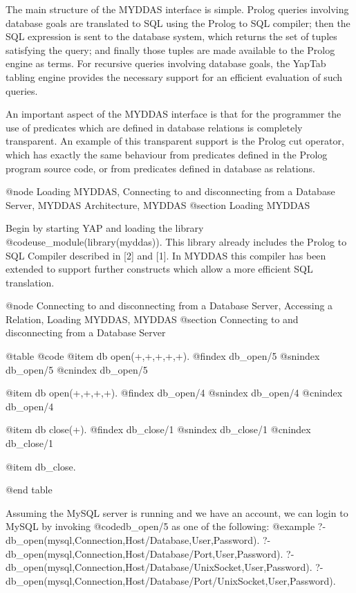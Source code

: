 {{{{{{{{{The main structure of the MYDDAS interface is simple. Prolog queries
involving database goals are translated to SQL using the Prolog to SQL
compiler; then the SQL expression is sent to the database system, which
returns the set of tuples satisfying the query; and finally those tuples
are made available to the Prolog engine as terms. For recursive queries
involving database goals, the YapTab tabling engine provides the
necessary support for an efficient evaluation of such queries.

An important aspect of the MYDDAS interface is that for the programmer
the use of predicates which are defined in database relations is
completely transparent. An example of this transparent support is the
Prolog cut operator, which has exactly the same behaviour from
predicates defined in the Prolog program source code, or from predicates
defined in database as relations.

@node Loading MYDDAS, Connecting to and disconnecting from a Database Server, MYDDAS Architecture, MYDDAS 
@section Loading MYDDAS

Begin by starting YAP and loading the library
@code{use_module(library(myddas))}.  This library already includes the
Prolog to SQL Compiler described in [2] and [1]. In MYDDAS this compiler
has been extended to support further constructs which allow a more
efficient SQL translation.  

@node Connecting to and disconnecting from a Database Server, Accessing a Relation, Loading MYDDAS, MYDDAS
@section Connecting to and disconnecting from a Database Server


@table @code
@item db open(+,+,+,+,+). 
@findex db_open/5
@snindex db_open/5
@cnindex db_open/5

@item db open(+,+,+,+). 
@findex db_open/4
@snindex db_open/4
@cnindex db_open/4

@item db close(+). 
@findex db_close/1
@snindex db_close/1
@cnindex db_close/1

@item db_close.

@end table 

  Assuming the MySQL server is running and we have an account, we can
login to MySQL by invoking @code{db_open/5} as one of the following:
@example
?- db_open(mysql,Connection,Host/Database,User,Password). 
?- db_open(mysql,Connection,Host/Database/Port,User,Password).
?- db_open(mysql,Connection,Host/Database/UnixSocket,User,Password). 
?- db_open(mysql,Connection,Host/Database/Port/UnixSocket,User,Password).

}}}}}}}}}
